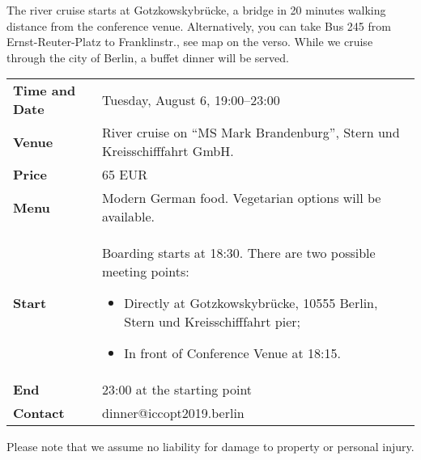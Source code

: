 The river cruise starts at Gotzkowskybrücke, a bridge in 20 minutes walking distance from the conference venue.
Alternatively, you can take Bus 245 from Ernst-Reuter-Platz to Franklinstr., see map on the verso. 
While we cruise through the city of Berlin, a buffet dinner will be served.
\par\medskip
\noindent{}
\par\vspace{1em}
\begin{tabularx}{\textwidth}{ >{\bfseries} l X}
	Time and Date & Tuesday, August 6, 19:00--23:00\\
	Venue & River cruise on ``MS Mark Brandenburg'', Stern und Kreisschifffahrt GmbH.\\
	Price & 65 EUR\\
Menu & Modern German food. Vegetarian options will be available.\\
Start & \setlength{\parskip}{0pt} Boarding starts at 18:30. There are two possible meeting points:

\smallskip
\begin{itemize}[leftmargin=10pt,labelwidth=5pt,nosep,topsep=0pt,partopsep=0pt]
  \item Directly at Gotzkowskybrücke, 10555 Berlin, Stern und Kreisschifffahrt pier;
  \item In front of Conference Venue at 18:15.
\end{itemize}
\vspace{-\baselineskip}
\\[-1em]
    End & 23:00 at the starting point\\
Contact & dinner@iccopt2019.berlin
\end{tabularx}

\bigskip

Please note that we assume no liability for damage to property or personal injury.
